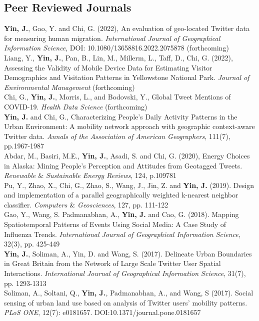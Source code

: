 \documentclass[11pt, a4paper]{article}
\newcommand{\years}[1]{\marginnote{\scriptsize #1}}
\begin{document}
\subsection*{Peer Reviewed Journals}
\noindent
\years{2022}\textbf{Yin, J.}, Gao, Y. and Chi, G. (2022), An evaluation of geo-located Twitter data for measuring human migration. \textit{International Journal of Geographical Information Science}, DOI: 10.1080/13658816.2022.2075878 (forthcoming)\\
\years{2022}Liang, Y., \textbf{Yin, J.},  Pan, B.,  Lin, M., Millerm, L., Taff, D., Chi, G. (2022), Assessing the Validity of Mobile Device Data for Estimating Visitor Demographics and Visitation Patterns in Yellowstone National Park. \textit{Journal of Environmental Management} (forthcoming) \\
\years{2022}Chi, G., \textbf{Yin, J.}, Morris, L., and Bodovski, Y., Global Tweet Mentions of COVID-19. \textit{Health Data Science} (forthcoming)\\
\years{2021}\textbf{Yin, J.} and  Chi, G., Characterizing People’s Daily Activity Patterns in the Urban Environment: A mobility network approach with geographic context-aware Twitter data. \textit{Annals of the Association of American Geographers}, 111(7), pp.1967-1987\\
\years{2020}Abdar, M., Basiri, M.E., \textbf{Yin, J.}, Asadi, S. and Chi, G. (2020), Energy Choices in Alaska: Mining People's Perception and Attitudes from Geotagged Tweets. \textit{Renewable $\&$ Sustainable Energy Reviews}, 124, p.109781\\
\years{2019}Pu, Y., Zhao, X., Chi, G., Zhao, S., Wang, J., Jin, Z. and \textbf{Yin, J.} (2019). Design and implementation of a parallel geographically weighted k-nearest neighbor classifier. \textit{Computers $\&$ Geosciences}, 127, pp. 111-122\\
\years{2018}Gao, Y., Wang, S. Padmanabhan, A., \textbf{Yin, J.} and Cao, G. (2018). Mapping Spatiotemporal Patterns of Events Using Social Media: A Case Study of Influenza Trends. \textit{International Journal of Geographical Information Science}, 32(3), pp. 425-449\\
\years{2017}\textbf{Yin, J.}, Soliman, A., Yin, D. and Wang, S. (2017). Delineate Urban Boundaries in Great Britain from the Network of Large Scale Twitter User Spatial Interactions. \textit{International Journal of Geographical Information Science}, 31(7), pp. 1293-1313\\
\years{2017}Soliman, A., Soltani, Q., \textbf{Yin, J.}, Padmanabhan, A., and Wang, S (2017). Social sensing of urban land use based on analysis of Twitter users' mobility patterns. \textit{PLoS ONE}, 12(7): e0181657. DOI:10.1371/journal.pone.0181657\\
\end{document}
